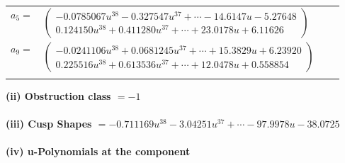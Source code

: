 \documentclass[1p]{elsarticle_modified}
\theoremstyle{definition}
\begin{document}
\begin{tabular}{m{7pt} m{180pt} m{7pt} m{180pt} }
\flushright $a_{5}=$&$\begin{pmatrix}-0.0785067 u^{38}-0.327547 u^{37}+\cdots-14.6147 u-5.27648\\0.124150 u^{38}+0.411280 u^{37}+\cdots+23.0178 u+6.11626\end{pmatrix}$ \\
\flushright $a_{9}=$&$\begin{pmatrix}-0.0241106 u^{38}+0.0681245 u^{37}+\cdots+15.3829 u+6.23920\\0.225516 u^{38}+0.613536 u^{37}+\cdots+12.0478 u+0.558854\end{pmatrix}$\\&\end{tabular}
\flushleft \textbf{(ii) Obstruction class $= -1$}\\~\\
\flushleft \textbf{(iii) Cusp Shapes $= -0.711169 u^{38}-3.04251 u^{37}+\cdots-97.9978 u-38.0725$}\\~\\
\newpage\renewcommand{\arraystretch}{1}
\flushleft \textbf{(iv) u-Polynomials at the component}\newline \\
\end{document}
